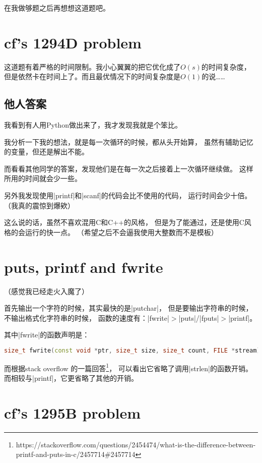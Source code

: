 在我做够题之后再想想这道题吧。


\section{cf's 1294D problem}

这道题有着严格的时间限制。我小心翼翼的把它优化成了$O(s)$的时间复杂度，
但是依然卡在时间上了。而且最优情况下的时间复杂度是$O(1)$的说\ldots\ldots

\subsection{他人答案}
我看到有人用Python做出来了，我才发现我就是个笨比。

我分析一下我的想法，就是每一次循环的时候，都从头开始算，
虽然有辅助记忆的变量，但还是解出不能。

而看看其他同学的答案，发现他们是在每一次之后接着上一次循环继续做。
这样所用的时间就会少一些。

另外我发现使用\vb|printf|和\vb|scanf|的代码会比不使用的代码，
运行时间会少十倍。（我真的震惊到爆欸）

这么说的话，虽然不喜欢混用C和C++的风格，
但是为了能通过，还是使用C风格的会运行的快一点。
（希望之后不会逼我使用大整数而不是模板）


\section{puts, printf and fwrite}

（感觉我已经走火入魔了）

首先输出一个字符的时候，其实最快的是\vb|putchar|，
但是要输出字符串的时候，不输出格式化字符串的时候，
函数的速度有：\vb|fwrite|$>$\vb|puts|/\vb|fputs|$>$\vb|printf|。

其中\vb|fwrite|的函数声明是：
\begin{lstlisting}[language=C++]
size_t fwrite(const void *ptr, size_t size, size_t count, FILE *stream);
\end{lstlisting}

而根据stack overflow
的一篇回答\footnote{https://stackoverflow.com/questions/2454474/what-is-the-difference-between-printf-and-puts-in-c/2457714\#2457714}，
可以看出它省略了调用\vb|strlen|的函数开销。
而相较与\vb|printf|，它更省略了其他的开销。


\section{cf's 1295B problem}

